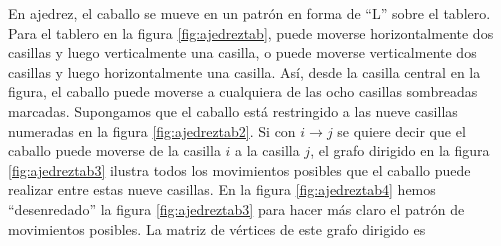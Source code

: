 \begin{examplebox}{}{}
    En ajedrez, el caballo se mueve en un patrón en forma de “L” sobre el tablero. Para el tablero en la figura \ref{fig:ajedreztab}, puede moverse horizontalmente dos casillas y luego verticalmente una casilla, o puede moverse verticalmente dos casillas y luego horizontalmente una casilla. Así, desde la casilla central en la figura, el caballo puede moverse a cualquiera de las ocho casillas sombreadas marcadas. Supongamos que el caballo está restringido a las nueve casillas numeradas en la figura \ref{fig:ajedreztab2}. Si con $i \to j$ se quiere decir que el caballo puede moverse de la casilla $i$ a la casilla $j$, el grafo dirigido en la figura \ref{fig:ajedreztab3} ilustra todos los movimientos posibles que el caballo puede realizar entre estas nueve casillas. En la figura \ref{fig:ajedreztab4} hemos “desenredado” la figura \ref{fig:ajedreztab3} para hacer más claro el patrón de movimientos posibles. La matriz de vértices de este grafo dirigido es
    \begin{matrizn}
    \end{matrizn}
\end{examplebox}

